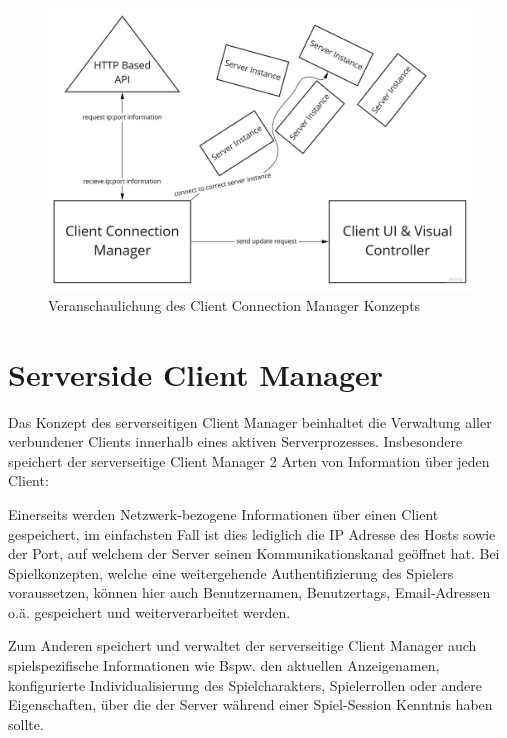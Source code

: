 \begin{figure}
	\centering
	\includegraphics[width=150mm]{images/Client_Connection_Manager.jpg}
	\caption[Client Connection Manager Diagramm]{Veranschaulichung des Client Connection Manager Konzepts}
	\label{pic:Client_Connection_Manager}
\end{figure}



\section{Serverside Client Manager}

Das Konzept des serverseitigen Client Manager beinhaltet die Verwaltung aller verbundener Clients innerhalb eines aktiven Serverprozesses. Insbesondere speichert der serverseitige Client Manager 2 Arten von Information über jeden Client:

Einerseits werden Netzwerk-bezogene Informationen über einen Client gespeichert, im einfachsten Fall ist dies lediglich die IP Adresse des Hosts sowie der Port, auf welchem der Server seinen Kommunikationskanal geöffnet hat. Bei Spielkonzepten, welche eine weitergehende Authentifizierung des Spielers voraussetzen, können hier auch Benutzernamen, Benutzertags, Email-Adressen o.ä. gespeichert und weiterverarbeitet werden.

Zum Anderen speichert und verwaltet der serverseitige Client Manager auch spielspezifische Informationen wie Bspw. den aktuellen Anzeigenamen, konfigurierte Individualisierung des Spielcharakters, Spielerrollen oder andere Eigenschaften, über die der Server während einer Spiel-Session Kenntnis haben sollte.

